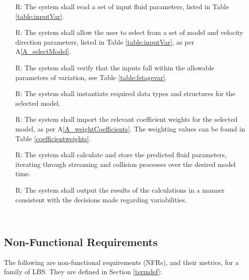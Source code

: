 \documentclass[12pt]{article}
\newcounter{reqnum} %
\begin{document}
\noindent \begin{itemize}

\item[R\refstepcounter{reqnum}\thereqnum \label{R_Inputs}:] The system shall read a set of input fluid parameters, listed in Table \ref{table:inputVar}.

\item[R\refstepcounter{reqnum}\thereqnum \label{R_ModelInputs}:] The system shall allow the user to select from a set of model and velocity direction parameters, listed in Table \ref{table:inputVar}, as per A\ref{A_selectModel}.

\item[R\refstepcounter{reqnum}\thereqnum \label{R_CheckInputs}:] The system shall verify that the inputs fall within the allowable parameters of variation, see Table \ref{table:fstagevar}.

\item[R\refstepcounter{reqnum}\thereqnum \label{R_Instantiate}:] The system shall instantiate required data types and structures for the selected model.

\item[R\refstepcounter{reqnum}\thereqnum \label{R_CoefficientWeights}:] The system shall import the relevant coefficient weights for the selected model, as per A\ref{A_weightCoefficients}. The weighting values can be found in Table \ref{coefficientweights}.

\item[R\refstepcounter{reqnum}\thereqnum \label{R_Calculate}:] The system shall calculate and store the predicted fluid parameters, iterating through streaming and collision processes over the desired model time.

\item[R\refstepcounter{reqnum}\thereqnum \label{R_Output}:] The system shall output the results of the calculations in a manner consistent with the decisions made regarding variabilities.

\end{itemize}

~\newpage

\subsection{Non-Functional Requirements}\label{CANFRS}

The following are non-functional requirements (NFRs), and their metrics, for a family of LBS. They are defined in Section \ref{termdef}:
\end{document}
